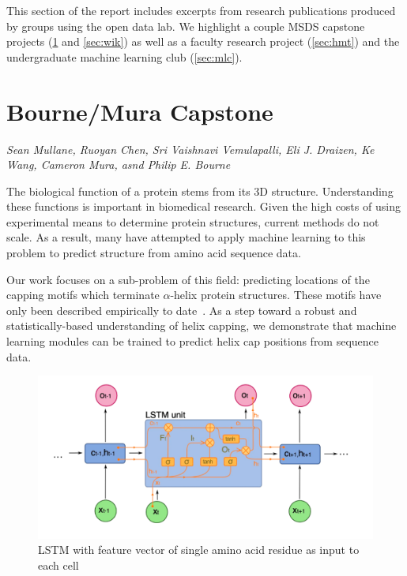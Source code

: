 This section of the report includes excerpts from research publications produced by groups using the open data lab. We highlight a couple MSDS capstone projects (\ref{sec:BMC} and \ref{sec:wik}) as well as a faculty research project (\ref{sec:hmt}) and the undergraduate machine learning club (\ref{sec:mlc}).

\pagebreak
\section{Bourne/Mura Capstone}
\label{sec:BMC}

\emph{Sean Mullane, Ruoyan Chen, Sri Vaishnavi Vemulapalli, Eli J. Draizen, Ke Wang, Cameron Mura, asnd Philip E. Bourne}
\bigskip

The biological function of a protein stems from its 3D structure. Understanding these functions is important in biomedical research. Given the high costs of using experimental means to determine protein structures, current methods do not scale. As a result, many have attempted to apply machine learning to this problem to predict structure from amino acid sequence data.

Our work focuses on a sub-problem of this field: predicting locations of the capping motifs which terminate $\alpha$-helix protein structures. These motifs have only been described empirically to date~\cite{ref:bmc}. As a step toward a robust and statistically-based understanding of helix capping, we demonstrate that machine learning modules can be trained to predict helix cap positions from sequence data.

\begin{figure}[!hbtp]
\includegraphics[width=\textwidth]{images/bmc1}
\caption[LSTM diagram]{LSTM with feature vector of single amino acid residue as input to each cell}
\end{figure}

